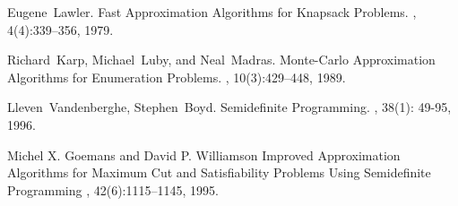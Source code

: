 \documentclass[11pt]{article}
\begin{document}




\begin{thebibliography}{42}


Eugene~Lawler.
\newblock Fast Approximation Algorithms for Knapsack Problems.
, 4(4):339--356, 1979.


Richard~Karp, Michael~Luby, and Neal~Madras.
\newblock Monte-Carlo Approximation Algorithms for Enumeration Problems.
, 10(3):429--448, 1989.


Lleven~Vandenberghe, Stephen~Boyd.
\newblock Semidefinite Programming.
, 38(1): 49-95, 1996.


Michel X. Goemans and David P. Williamson
\newblock Improved Approximation Algorithms for Maximum Cut and Satisfiability Problems Using Semidefinite Programming
, 42(6):1115--1145, 1995.

\end{thebibliography}
\end{document}

